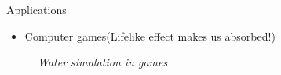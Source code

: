 \documentclass{beamer}
\begin{document}
\begin{frame}{Applications}
  \begin{itemize}
    \item Computer games(Lifelike effect makes us absorbed!)
  \end{itemize}
  
  \begin{figure}[thpb]
    \centering
    \caption*{\emph{Water simulation in games}}
  \label{fig:2}
  \end{figure}
\end{frame}
\end{document}
